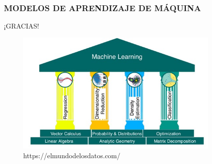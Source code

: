 \documentclass{beamer}
\begin{document}
\begin{frame}
	\frametitle{MODELOS DE APRENDIZAJE DE MÁQUINA}
	\begin{block}{¡GRACIAS!}	
				\begin{figure}
			\includegraphics[width=0.9\textwidth]{pilares ML}
			\caption{https://elmundodelosdatos.com/}
		\end{figure}

	\end{block}
\end{frame}
\end{document}
